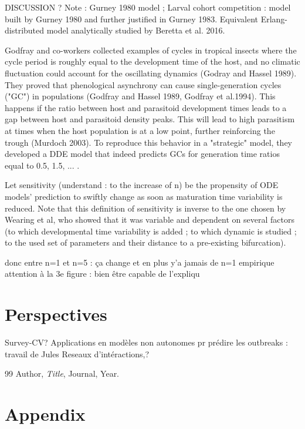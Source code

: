 \documentclass[12pt,a4paper,onecolumn]{article}
\newcommand{\noPageNumber}{\thispagestyle{empty}}
\begin{document}
DISCUSSION ? 
Note : Gurney 1980 model ; Larval cohort competition : model built by Gurney 1980 and further justified in Gurney 1983. Equivalent Erlang-distributed model analytically studied by Beretta et al. 2016.

Godfray and co-workers collected examples of cycles in tropical insects where the cycle period is roughly equal to the development time of the host, and no climatic fluctuation could account for the oscillating dynamics (Godray and Hassel 1989). They proved that phenological asynchrony can cause single-generation cycles ("GC") in populations (Godfray and Hassel 1989, Godfray et al.1994). This happens if the ratio between host and parasitoid development times leads to a gap between host and parasitoid density peaks. This will lead to high parasitism at times when the host population is at a low point, further reinforcing the trough (Murdoch 2003).  To reproduce this behavior in a "strategic" model, they developed a DDE model that indeed predicts GCs for generation time ratios equal to 0.5, 1.5, ... . 

Let sensitivity (understand : to the increase of n) be the propensity of ODE models’ prediction to swiftly change as soon as maturation time variability is reduced.  Note that this definition of sensitivity is inverse to the one chosen by Wearing et al, who showed that it was variable and dependent on several factors (to which developmental time variability is added ; to which dynamic is studied ; to the used set of parameters and their distance to a pre-existing bifurcation).  



donc entre n=1 et n=5 : ça change et en plus y'a jamais de n=1 empirique
attention à la 3e figure : bien être capable de l'expliqu


\section{Perspectives}
Survey-CV? 
Applications en modèles non autonomes pr prédire les outbreaks : travail de Jules
Reseaux d'intéractions,?

\newpage
\noPageNumber
\begin{thebibliography}{99}
 Author, \emph{Title}, Journal, Year.
\end{thebibliography}

\newpage
\noPageNumber
\appendix
\section{Appendix}
\end{document}
